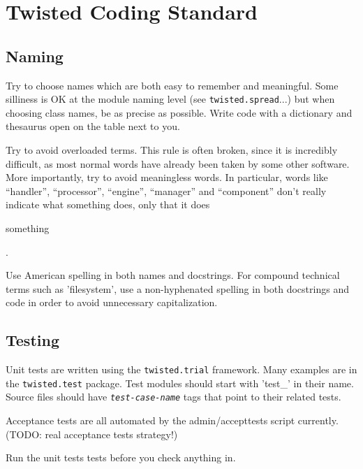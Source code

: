 \section{Twisted Coding Standard\label{doc/howto/policy/coding-standard.xhtml}}


\subsection{Naming}


Try to choose names which are both easy to remember and     meaningful. Some silliness is OK at the module naming level     (see \texttt{twisted.\linebreak[1]spread}...) but when     choosing class names, be as precise as possible. Write code     with a dictionary and thesaurus open on the table next to     you.

Try to avoid overloaded terms. This rule is often broken,     since it is incredibly difficult, as most normal words have     already been taken by some other software. More importantly,     try to avoid meaningless words. In particular, words like     ``handler'', ``processor'', ``engine'', ``manager''     and ``component'' don't really indicate what something does,     only that it does     \begin{em}something\end{em}.

Use American spelling in both names and docstrings.  For compound      technical terms such as 'filesystem', use a non-hyphenated spelling in      both docstrings and code in order to avoid unnecessary      capitalization. 

\subsection{Testing}


Unit tests are written using the \texttt{twisted.\linebreak[1]trial} framework. Many examples are in the     \texttt{twisted.\linebreak[1]test} package. Test modules should start     with 'test\_' in their name. Source files should have \textit{\texttt{test-case-name}} tags that     point to their related tests.

Acceptance tests are all automated by the admin/accepttests     script currently. (TODO: real acceptance tests strategy!)

Run the unit tests tests before you check anything in.

